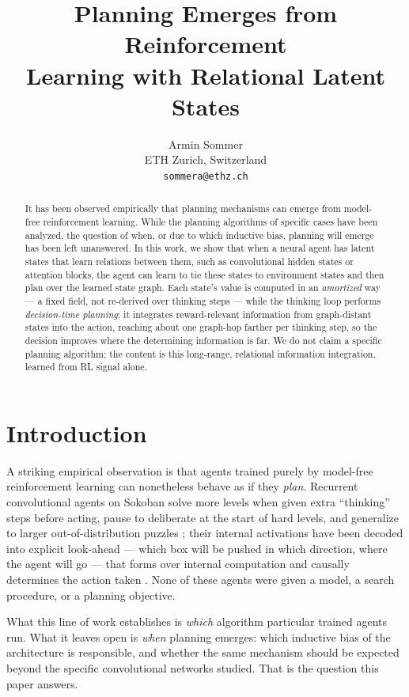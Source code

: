 \documentclass{article} %
\title{Planning Emerges from Reinforcement \\ Learning with Relational Latent States}
\author{{Armin Sommer} \\
{ETH Zurich, Switzerland}\\
{\texttt{sommera@ethz.ch}}}
\theoremstyle{plain}
\theoremstyle{definition}
\begin{document}
\maketitle

\begin{abstract}
It has been observed empirically that planning mechanisms can emerge from
model-free reinforcement learning. While the planning algorithms of specific
cases have been analyzed, the question of when, or due to which inductive
bias, planning will emerge has been left unanswered. In this work, we show
that when a neural agent has latent states that learn relations between them,
such as convolutional hidden states or attention blocks, the agent can learn
to tie these states to environment states and then plan over the learned state
graph. Each state's value is computed in an \emph{amortized} way --- a fixed field,
not re-derived over thinking steps --- while the thinking loop performs
\emph{decision-time planning}: it integrates reward-relevant information from
graph-distant states into the action, reaching about one graph-hop farther per
thinking step, so the decision improves where the determining information is far.
We do not claim a specific planning algorithm; the content is this long-range,
relational information integration, learned from RL signal alone.
\end{abstract}

\section{Introduction}
\label{sec:intro}

A striking empirical observation is that agents trained purely by model-free
reinforcement learning can nonetheless behave as if they \emph{plan}. Recurrent
convolutional agents on Sokoban solve more levels when given extra
``thinking'' steps before acting, pause to deliberate at the start of hard
levels, and generalize to larger out-of-distribution puzzles
\citep{guez2019investigation}; their internal activations have been decoded
into explicit look-ahead --- which box will be pushed in which direction, where
the agent will go --- that forms over internal computation and causally
determines the action taken \citep{bush2025interpreting,taufeeque2024planning}.
None of these agents were given a model, a search procedure, or a planning
objective.

What this line of work establishes is \emph{which} algorithm particular
trained agents run. What it leaves open is \emph{when} planning emerges:
which inductive bias of the architecture is responsible, and whether the same
mechanism should be expected beyond the specific convolutional networks
studied. That is the question this paper answers.
\end{document}
